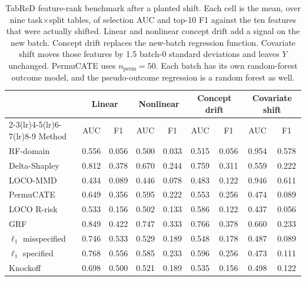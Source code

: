 \begin{table}[t]
\centering
\caption{TabReD feature-rank benchmark after a planted shift. Each cell is the mean, over nine task$\times$split tables, of selection AUC and top-10 F1 against the ten features that were actually shifted. Linear and nonlinear concept drift add a signal on the new batch. Concept drift replaces the new-batch regression function. Covariate shift moves those features by 1.5 batch-0 standard deviations and leaves $Y$ unchanged. PermuCATE uses $n_{\mathrm{perm}}=50$. Each batch has its own random-forest outcome model, and the pseudo-outcome regression is a random forest as well.}
\label{tab:tabred-planted-shift}
\begin{tabular}{lcccccccc}
\toprule
& \multicolumn{2}{c}{Linear} & \multicolumn{2}{c}{Nonlinear} & \multicolumn{2}{c}{Concept drift} & \multicolumn{2}{c}{Covariate shift} \\
\cmidrule(lr){2-3}\cmidrule(lr){4-5}\cmidrule(lr){6-7}\cmidrule(lr){8-9}
Method & AUC & F1 & AUC & F1 & AUC & F1 & AUC & F1 \\
\midrule
RF-domain & 0.556 & 0.056 & 0.500 & 0.033 & 0.515 & 0.056 & 0.954 & 0.578 \\
Delta-Shapley & 0.812 & 0.378 & 0.670 & 0.244 & 0.759 & 0.311 & 0.559 & 0.222 \\
LOCO-MMD & 0.434 & 0.089 & 0.446 & 0.078 & 0.483 & 0.122 & 0.946 & 0.611 \\
PermuCATE & 0.649 & 0.356 & 0.595 & 0.222 & 0.553 & 0.256 & 0.474 & 0.089 \\
LOCO R-risk & 0.533 & 0.156 & 0.502 & 0.133 & 0.586 & 0.122 & 0.437 & 0.056 \\
GRF & 0.849 & 0.422 & 0.747 & 0.333 & 0.766 & 0.378 & 0.660 & 0.233 \\
$\ell_1$ misspecified & 0.746 & 0.533 & 0.529 & 0.189 & 0.548 & 0.178 & 0.487 & 0.089 \\
$\ell_1$ specified & 0.768 & 0.556 & 0.585 & 0.233 & 0.596 & 0.256 & 0.473 & 0.111 \\
Knockoff & 0.698 & 0.500 & 0.521 & 0.189 & 0.535 & 0.156 & 0.498 & 0.122 \\
\bottomrule
\end{tabular}
\end{table}
